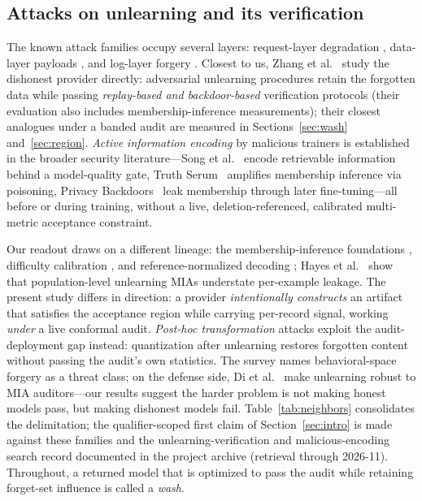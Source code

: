 \documentclass[lettersize,journal]{IEEEtran}
\begin{document}
\subsection{Attacks on unlearning and its verification}
The known attack families occupy several layers: request-layer
degradation \cite{huang2025unlearn}, data-layer payloads
\cite{di2023hidden}, and log-layer forgery
\cite{thudi2022necessity}. Closest to us, Zhang et
al.~\cite{zhang2024fragile} study the dishonest provider
directly: adversarial unlearning procedures retain the
forgotten data while passing \emph{replay-based and
backdoor-based} verification protocols (their evaluation also
includes membership-inference measurements); their closest
analogues under a banded audit are measured in
Sections~\ref{sec:wash} and~\ref{sec:region}.
\emph{Active information encoding} by malicious trainers is
established in the broader security literature---Song et
al.~\cite{song2017remember} encode retrievable information
behind a model-quality gate, Truth
Serum~\cite{truthserum2022} amplifies membership inference
via poisoning, Privacy Backdoors~\cite{wen2024privacy} leak
membership through later fine-tuning---all before or during
training, without a live, deletion-referenced, calibrated
multi-metric acceptance constraint.

Our readout draws on a different lineage: the
membership-inference foundations
\cite{shokri2017membership, yeom2018privacy, salem2019mlleaks},
difficulty calibration \cite{watson2022importance}, and
reference-normalized decoding \cite{carlini2022membership};
Hayes et al.~\cite{hayes2024inexact} show that
population-level unlearning MIAs understate per-example
leakage. The present study differs in direction: a provider
\emph{intentionally constructs} an artifact that satisfies the
acceptance region while carrying per-record signal, working
\emph{under} a live conformal audit.
\emph{Post-hoc transformation} attacks exploit the
audit-deployment gap instead: quantization after unlearning
restores forgotten content \cite{zhang2025catastrophic}
without passing the audit's own statistics. The survey
\cite{xue2025survey} names behavioral-space forgery as a
threat class; on the defense side, Di et
al.~\cite{di2024adversarial} make unlearning robust to MIA
auditors---our results suggest the harder problem is not
making honest models pass, but making dishonest models fail.
Table~\ref{tab:neighbors} consolidates the delimitation; the
qualifier-scoped first claim of Section~\ref{sec:intro} is
made against these families and the unlearning-verification
and malicious-encoding search record documented in the
project archive (retrieval through 2026-11). Throughout, a
returned model that is optimized to pass the audit while
retaining forget-set influence is called a \emph{wash}.
\end{document}
